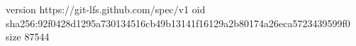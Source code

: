 version https://git-lfs.github.com/spec/v1
oid sha256:92f0428d1295a730134516cb49b13141f16129a2b80174a26eca5723439599f0
size 87544
